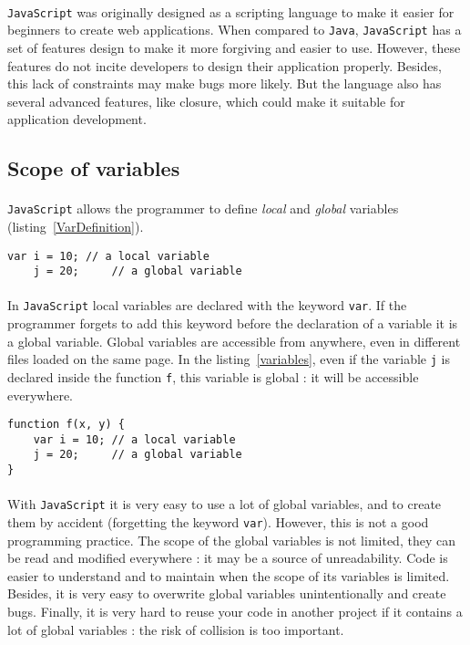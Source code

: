 \paragraph{} 
\texttt{JavaScript} was originally designed as a scripting language to make it easier for beginners to create web applications. When compared to \texttt{Java}, \texttt{JavaScript} has a set of features design to make it more forgiving and easier to use. However, these features do not incite developers to design their application properly. Besides, this lack of constraints may make bugs more likely. But the language also has several advanced features, like closure, which could make it suitable for application development.

\subsection{Scope of variables}

\paragraph{}
\texttt{JavaScript} allows the programmer to define \emph{local} and \emph{global} variables (listing~\ref{VarDefinition}).
\begin{lstlisting}[caption={Defining variables}, label={VarDefinition}]
    var i = 10; // a local variable
    j = 20;     // a global variable
\end{lstlisting}

\paragraph{}
In \texttt{JavaScript} local variables are declared with the keyword \texttt{var}. If the programmer forgets to add this keyword before the declaration of a variable it is a global variable. Global variables are accessible from anywhere, even in different files loaded on the same page. In the listing~\ref{variables}, even if the variable \texttt{j} is declared inside the function \texttt{f}, this variable is global : it will be accessible everywhere.  
\begin{lstlisting}[caption={Global and local variables}, label={variables}]
function f(x, y) {
    var i = 10; // a local variable
    j = 20;     // a global variable
}
\end{lstlisting}

\paragraph{}
With \texttt{JavaScript} it is very easy to use a lot of global variables, and to create them by accident (forgetting the keyword \texttt{var}). However, this is not a good programming practice. The scope of the global variables is not limited, they can be read and modified everywhere : it may be a source of unreadability. Code is easier to understand and to maintain when the scope of its variables is limited. Besides, it is very easy to overwrite global variables unintentionally and create bugs. Finally, it is very hard to reuse your code in another project if it contains a lot of global variables : the risk of collision is too important.

